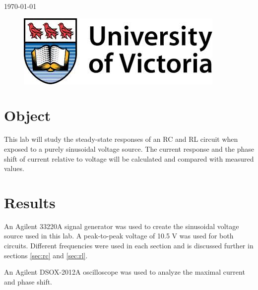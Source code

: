 \documentclass[12pt]{article}
\begin{document}
\begin{titlepage}
{\large \today}\\ %

\begin{figure}[b]	 %
	\centering
	\includegraphics[scale=0.3]{UVic_logo}
\end{figure}

\end{titlepage}





\section{Object}\label{sec:object}
This lab will study the steady-state responses of an RC and RL circuit when exposed to a purely sinusoidal voltage source. The current response and the phase shift of current relative to voltage will be calculated and compared with measured values.

\section{Results}\label{sec:results}
An Agilent 33220A signal generator was used to create the sinusoidal voltage source used in this lab. A peak-to-peak voltage of 10.5 V was used for both circuits. Different frequencies were used in each section and is discussed further in sections \ref{sec:rc} and \ref{sec:rl}.

An Agilent DSOX-2012A oscilloscope was used to analyze the maximal current and phase shift.
\end{document}
